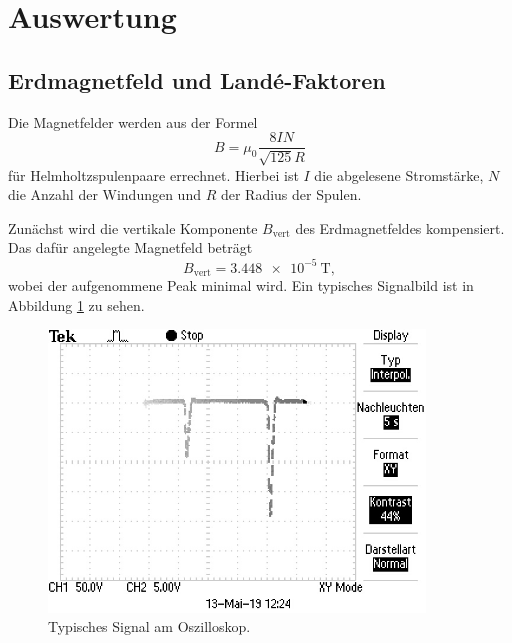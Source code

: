 \newpage
\section{Auswertung}
\subsection{Erdmagnetfeld und Landé-Faktoren}
\label{sec:Auswertung}

\FloatBarrier
Die Magnetfelder werden aus der Formel
\begin{equation}
B=\mu_0\frac{8 I N}{\sqrt{125}R}
\end{equation}
für Helmholtzspulenpaare errechnet.
Hierbei ist $I$ die abgelesene Stromstärke, $N$ die Anzahl der Windungen und $R$ der Radius der Spulen.

Zunächst wird die vertikale Komponente $B_{\text{vert}}$ des Erdmagnetfeldes kompensiert.
Das dafür angelegte Magnetfeld beträgt
\begin{equation}
B_{\text{vert}}=\SI{3.448e-5}{\tesla},
\end{equation}
wobei der aufgenommene Peak minimal wird.
Ein typisches Signalbild ist in Abbildung \ref{fig:Signal} zu sehen.
 \begin{figure}
   \centering
   \includegraphics[width=10cm]{pictures/TEK0008.JPG}
   \caption{Typisches Signal am Oszilloskop.}
   \label{fig:Signal}
 \end{figure}
 \FloatBarrier

